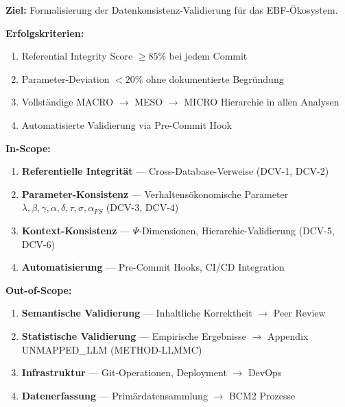 \begin{tcolorbox}[colback=purple!5!white, colframe=purple!75!black, title=Appendix Scope:]

\textbf{Ziel:} Formalisierung der Datenkonsistenz-Validierung für das EBF-Ökosystem.

\vspace{0.3em}
\textbf{Erfolgskriterien:}
\begin{enumerate}[label=\textbf{Z\arabic*}:, leftmargin=2cm]
    \item Referential Integrity Score $\geq 85\%$ bei jedem Commit
    \item Parameter-Deviation $< 20\%$ ohne dokumentierte Begründung
    \item Vollständige MACRO $\to$ MESO $\to$ MICRO Hierarchie in allen Analysen
    \item Automatisierte Validierung via Pre-Commit Hook
\end{enumerate}

\vspace{0.3em}
\textbf{In-Scope:}
\begin{enumerate}[label=\textbf{IS\arabic*}:, leftmargin=2cm]
    \item \textbf{Referentielle Integrität} --- Cross-Database-Verweise (DCV-1, DCV-2)
    \item \textbf{Parameter-Konsistenz} --- Verhaltensökonomische Parameter $\lambda, \beta, \gamma, \alpha, \delta, \tau, \sigma, \alpha_{FS}$ (DCV-3, DCV-4)
    \item \textbf{Kontext-Konsistenz} --- $\Psi$-Dimensionen, Hierarchie-Validierung (DCV-5, DCV-6)
    \item \textbf{Automatisierung} --- Pre-Commit Hooks, CI/CD Integration
\end{enumerate}

\vspace{0.3em}
\textbf{Out-of-Scope:}
\begin{enumerate}[label=\textbf{OS\arabic*}:, leftmargin=2cm]
    \item \textbf{Semantische Validierung} --- Inhaltliche Korrektheit $\to$ Peer Review
    \item \textbf{Statistische Validierung} --- Empirische Ergebnisse $\to$ Appendix UNMAPPED_LLM (METHOD-LLMMC)
    \item \textbf{Infrastruktur} --- Git-Operationen, Deployment $\to$ DevOps
    \item \textbf{Datenerfassung} --- Primärdatensammlung $\to$ BCM2 Prozesse
\end{enumerate}


\end{tcolorbox}
